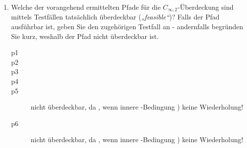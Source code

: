 \documentclass{lehramt-informatik-minimal}
\begin{document}
\begin{enumerate}
\begin{enumerate}
\begin{antwort}
\begin{description}
\end{description}
\end{antwort}
\end{enumerate}

mit \textbf{minimaler} Testfallanzahl und \textbf{möglichst kurzen}
Pfaden genügen würden.


\item Welche der vorangehend ermittelten Pfade für die
$C_{\infty,2}$-Überdeckung sind mittels Testfällen tatsächlich
überdeckbar (\emph{„feasible“})? Falls der Pfad ausführbar ist, geben
Sie den zugehörigen Testfall an - andernfalls begründen Sie kurz,
weshalb der Pfad nicht überdeckbar ist.

\begin{antwort}
\begin{description}
\item[p1] 

\item[p2] 

\item[p3] 

\item[p4] 

\item[p5]
nicht überdeckbar, da , wenn innere
-Bedingung ) keine Wiederholung!

\item[p6]
nicht überdeckbar, da , wenn innere
-Bedingung ) keine Wiederholung!


\end{description}
\end{antwort}
\end{enumerate}
\end{document}
